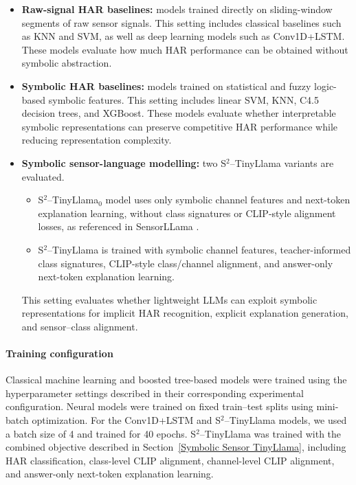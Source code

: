 \documentclass[preprint,12pt]{elsarticle}
\begin{document}
\begin{itemize}
    \item \textbf{Raw-signal HAR baselines:} models trained directly on sliding-window segments of raw sensor signals. This setting includes classical baselines such as KNN and SVM, as well as deep learning models such as Conv1D+LSTM. These models evaluate how much HAR performance can be obtained without symbolic abstraction.
    
    \item \textbf{Symbolic HAR baselines:} models trained on statistical and fuzzy logic-based symbolic features. This setting includes linear SVM, KNN, C4.5 decision trees, and XGBoost. These models evaluate whether interpretable symbolic representations can preserve competitive HAR performance while reducing representation complexity.
    
    \item \textbf{Symbolic sensor-language modelling:} two S$^2$--TinyLlama variants are evaluated. \begin{itemize}
        \item S$^2$--TinyLlama$_0$ model uses only symbolic channel features and next-token explanation learning, without class signatures or CLIP-style alignment losses, as referenced in SensorLLama \cite{li2025sensorllm}.
        \item S$^2$--TinyLlama  is trained with symbolic channel features, teacher-informed class signatures, CLIP-style class/channel alignment, and answer-only next-token explanation learning. 
    \end{itemize}  
    This setting evaluates whether lightweight LLMs can exploit symbolic representations for implicit HAR recognition, explicit explanation generation, and sensor--class alignment.
\end{itemize}

\paragraph{Training configuration}
Classical machine learning and boosted tree-based models were trained using the hyperparameter settings described in their corresponding experimental configuration. Neural models were trained on fixed train--test splits using mini-batch optimization. For the Conv1D+LSTM and S$^2$--TinyLlama models, we used a batch size of 4 and trained for 40 epochs. S$^2$--TinyLlama was trained with the combined objective described in Section~\ref{Symbolic Sensor TinyLlama}, including HAR classification, class-level CLIP alignment, channel-level CLIP alignment, and answer-only next-token explanation learning.
\end{document}
